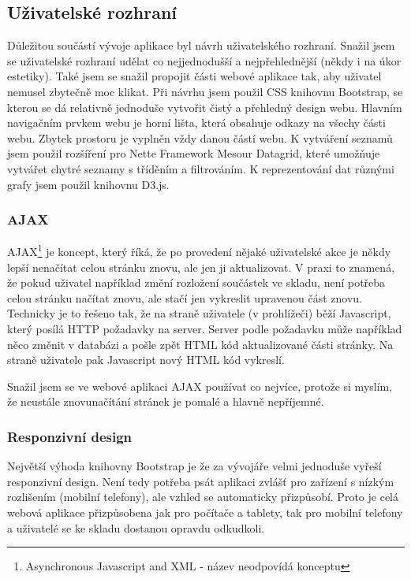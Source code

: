 \documentclass[12pt, a4paper, oneside]{article}
\begin{document}
\subsection{Uživatelské rozhraní}

Důležitou součástí vývoje aplikace byl návrh uživatelského rozhraní. Snažil jsem se uživatelské rozhraní udělat co nejjednodušší a nejpřehlednější (někdy i na úkor estetiky). Také jsem se snažil propojit části webové aplikace tak, aby uživatel nemusel zbytečně moc klikat. Při návrhu jsem použil CSS knihovnu Bootstrap, se kterou se dá relativně jednoduše vytvořit čistý a přehledný design webu. Hlavním navigačním prvkem webu je horní lišta, která obsahuje odkazy na všechy části webu. Zbytek prostoru je vyplněn vždy danou částí webu. K vytváření seznamů jsem použil rozšíření pro Nette Framework Mesour Datagrid, které umožňuje vytvářet chytré seznamy s tříděním a filtrováním. K reprezentování dat různými grafy jsem použil knihovnu D3.js.

\subsubsection{AJAX}

AJAX\footnote{Asynchronous Javascript and XML - název neodpovídá konceptu} je koncept, který říká, že po provedení nějaké uživatelské akce je někdy lepší nenačítat celou stránku znovu, ale jen ji aktualizovat. V praxi to znamená, že pokud uživatel například změní rozložení součástek ve skladu, není potřeba celou stránku načítat znovu, ale stačí jen vykreslit upravenou část znovu. Technicky je to řešeno tak, že na straně uživatele (v prohlížeči) běží Javascript, který posílá HTTP požadavky na server. Server podle požadavku může například něco změnit v databázi a pošle zpět HTML kód aktualizované části stránky. Na straně uživatele pak Javascript nový HTML kód vykreslí.

Snažil jsem se ve webové aplikaci AJAX používat co nejvíce, protože si myslím, že neustále znovunačítání stránek je pomalé a hlavně nepříjemné.

\subsubsection{Responzivní design}

Největší výhoda knihovny Bootstrap je že za vývojáře velmi jednoduše vyřeší responzivní design. Není tedy potřeba psát aplikaci zvlášť pro zařízení s nízkým rozlišením (mobilní telefony), ale vzhled se automaticky přizpůsobí. Proto je celá webová aplikace přizpůsobena jak pro počítače a tablety, tak pro mobilní telefony a uživatelé se ke skladu dostanou opravdu odkudkoli.
\end{document}
